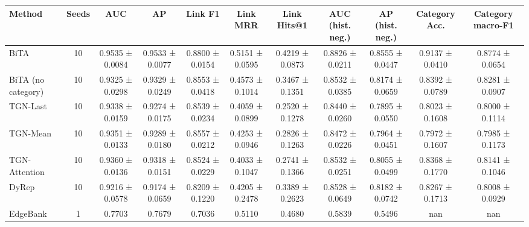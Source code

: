 \begin{tabular}{lcccccccccc}
\toprule
Method & Seeds & AUC & AP & Link F1 & Link MRR & Link Hits@1 & AUC (hist. neg.) & AP (hist. neg.) & Category Acc. & Category macro-F1 \\
\midrule
BiTA & 10 & 0.9535 ± 0.0084 & 0.9533 ± 0.0077 & 0.8800 ± 0.0154 & 0.5151 ± 0.0595 & 0.4219 ± 0.0873 & 0.8826 ± 0.0211 & 0.8555 ± 0.0447 & 0.9137 ± 0.0410 & 0.8774 ± 0.0654 \\
BiTA (no category) & 10 & 0.9325 ± 0.0298 & 0.9329 ± 0.0249 & 0.8553 ± 0.0418 & 0.4573 ± 0.1014 & 0.3467 ± 0.1351 & 0.8532 ± 0.0385 & 0.8174 ± 0.0659 & 0.8392 ± 0.0789 & 0.8281 ± 0.0907 \\
TGN-Last & 10 & 0.9338 ± 0.0159 & 0.9274 ± 0.0175 & 0.8539 ± 0.0234 & 0.4059 ± 0.0899 & 0.2520 ± 0.1278 & 0.8440 ± 0.0260 & 0.7895 ± 0.0550 & 0.8023 ± 0.1608 & 0.8000 ± 0.1114 \\
TGN-Mean & 10 & 0.9351 ± 0.0133 & 0.9289 ± 0.0180 & 0.8557 ± 0.0212 & 0.4253 ± 0.0946 & 0.2826 ± 0.1263 & 0.8472 ± 0.0226 & 0.7964 ± 0.0451 & 0.7972 ± 0.1607 & 0.7985 ± 0.1173 \\
TGN-Attention & 10 & 0.9360 ± 0.0136 & 0.9318 ± 0.0151 & 0.8524 ± 0.0229 & 0.4033 ± 0.1047 & 0.2741 ± 0.1366 & 0.8532 ± 0.0251 & 0.8055 ± 0.0499 & 0.8368 ± 0.1770 & 0.8141 ± 0.1046 \\
DyRep & 10 & 0.9216 ± 0.0578 & 0.9174 ± 0.0659 & 0.8209 ± 0.1220 & 0.4205 ± 0.2478 & 0.3389 ± 0.2623 & 0.8528 ± 0.0649 & 0.8182 ± 0.0742 & 0.8267 ± 0.1713 & 0.8008 ± 0.0929 \\
EdgeBank & 1 & 0.7703 & 0.7679 & 0.7036 & 0.5110 & 0.4680 & 0.5839 & 0.5496 & nan & nan \\
\bottomrule
\end{tabular}
